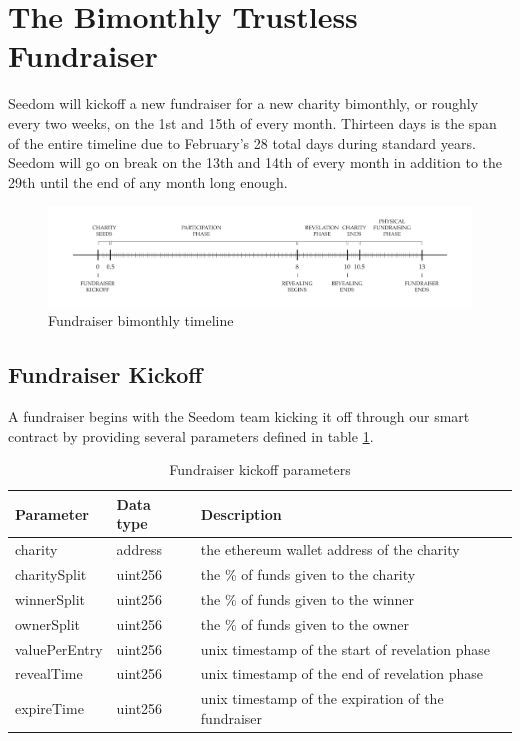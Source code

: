 \documentclass[11pt]{article}
\begin{document}
\section{The Bimonthly Trustless Fundraiser}

Seedom will kickoff a new fundraiser for a new charity bimonthly, or roughly every two weeks, on the 1st and 15th of every month. Thirteen days is the span of the entire timeline due to February's 28 total days during standard years. Seedom will go on break on the 13th and 14th of every month in addition to the 29th until the end of any month long enough.

\begin{figure}[H]
\begin{center}
\includegraphics[width=1.0\textwidth]{fundraiserBimonthlyTimeline.pdf}
\caption{Fundraiser bimonthly timeline}
\label{figure:fundraiserBimonthlyTimeline}
\end{center}
\end{figure}

\subsection{Fundraiser Kickoff}
A fundraiser begins with the Seedom team kicking it off through our smart contract by providing several parameters defined in table \ref{tab:fundraiserKickoffParameters}.

\begin{table}[H]
\begin{center}
\begin{tabular}{| l | l | l |}
\hline
\textbf{Parameter} & \textbf{Data type} & \textbf{Description} \\ \hline
charity & address & the ethereum wallet address of the charity \\ \hline
charitySplit & uint256 & the \% of funds given to the charity \\ \hline
winnerSplit & uint256 & the \% of funds given to the winner \\ \hline
ownerSplit & uint256 & the \% of funds given to the owner \\ \hline
valuePerEntry & uint256 & unix timestamp of the start of revelation phase \\ \hline
revealTime & uint256 & unix timestamp of the end of revelation phase \\ \hline
expireTime & uint256 & unix timestamp of the expiration of the fundraiser \\ \hline
\end{tabular}
\caption{Fundraiser kickoff parameters}
\label{tab:fundraiserKickoffParameters}
\end{center}
\end{table}
\end{document}
